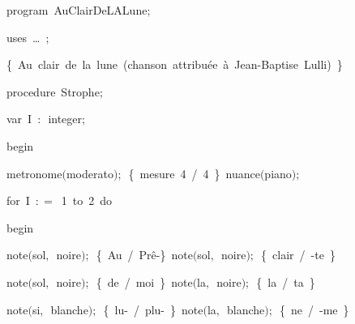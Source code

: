 
{
\parindent {}
\medskip

\carrenoir
\vspace{\neglskip}\mbox{\blc  \idt  \mcl program\idt \label{prog:AuClairDeLALune}\ AuClairDeLALune$;$
}\par 
\vspace{\neglskip}\mbox{\blc \blk\idt \mcl uses\idt \ \ldots\ $;$
}\par 
\medskip

\vspace{\neglskip}\mbox{\blc  \blk\idt  \cmt  \{\ Au\ clair\ de\ la\ lune\ (chanson\ attribuée\ à\ Jean-Baptise\ Lulli)\ \}\idt }\par 
\medskip

\pagebreak[3] 
\vspace{\neglskip}\mbox{\blc  \blk\idt  \mcl procedure\idt \ Strophe$;$}\par 
\pagebreak[3] 
\vspace{\neglskip}\mbox{\blc  \blk\blk\idt  \mcl var\idt \ I\ $:$\ integer$;$}\par 
\vspace{\neglskip}\mbox{\blc  \blk\idt  \mcl begin\idt }\par 
\vspace{\neglskip}\mbox{\blc  \blk\blk\idt  metronome$($moderato$)$$;$\ \cmt  \{\ mesure\ 4\ /\ 4\ \}\idt \ nuance$($piano$)$$;$}\par 
\pagebreak[3] 
\vspace{\neglskip}\mbox{\blc  \blk\blk\idt  \mcl for\idt \ I\ $:$$=$\ 1\ \mcl to\idt \ 2\ \mcl do\idt \ }\par 
\vspace{\neglskip}\mbox{\blc  \blk\blk\blk\idt  \mcl begin\idt }\par 
\vspace{\neglskip}\mbox{\blc  \blk\blk\blk\blk\idt  note$($sol$,$\ noire$)$$;$\ \cmt  \{\ Au\ /\ Prê-\}\idt \ note$($sol$,$\ noire$)$$;$\ \cmt  \{\ clair\ /\ -te\ \}\idt \ \ }\par 
\vspace{\neglskip}\mbox{\blc  \blk\blk\blk\blk\idt  note$($sol$,$\ noire$)$$;$\ \cmt  \{\ de\ /\ moi\ \}\idt \ note$($la$,$\ noire$)$$;$\ \cmt  \{\ la\ /\ ta\ \}\idt }\par 
\vspace{\neglskip}\mbox{\blc  \blk\blk\blk\blk\idt  note$($si$,$\ blanche$)$$;$\ \cmt  \{\ lu-\ /\ plu-\ \}\idt \ note$($la$,$\ blanche$)$$;$\ \cmt  \{\ ne\ /\ -me\ \}\idt }\par 
}

